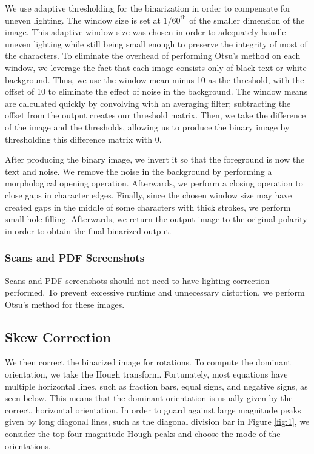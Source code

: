 \documentclass[journal]{IEEEtran}
\begin{document}
We use adaptive thresholding for the binarization in order to compensate for uneven lighting. The window size is set at $1/60^{\text{th}}$ of the smaller dimension of the image. This adaptive window size was chosen in order to adequately handle uneven lighting while still being small enough to preserve the integrity of most of the characters. To eliminate the overhead of performing Otsu's method on each window, we leverage the fact that each image consists only of black text or white background. Thus, we use the window mean minus 10 as the threshold, with the offset of 10 to eliminate the effect of noise in the background. The window means are calculated quickly by convolving with an averaging filter; subtracting the offset from the output creates our threshold matrix. Then, we take the difference of the image and the thresholds, allowing us to produce the binary image by thresholding this difference matrix with $0$.

After producing the binary image, we invert it so that the foreground is now the text and noise. We remove the noise in the background by performing a morphological opening operation. Afterwards, we perform a closing operation to close gaps in character edges. Finally, since the chosen window size may have created gaps in the middle of some characters with thick strokes, we perform small hole filling. Afterwards, we return the output image to the original polarity in order to obtain the final binarized output.

\subsubsection{Scans and PDF Screenshots}
 Scans and PDF screenshots should not need to have lighting correction performed. To prevent excessive runtime and unnecessary distortion, we perform Otsu's method for these images.
 
 \subsection{Skew Correction}
 We then correct the binarized image for rotations. To compute the dominant orientation, we take the Hough transform. Fortunately, most equations have multiple horizontal lines, such as fraction bars, equal signs, and negative signs, as seen below. This means that the dominant orientation is usually given by the correct, horizontal orientation. In order to guard against large magnitude peaks given by long diagonal lines, such as the diagonal division bar in Figure \ref{fig:1}, we consider the top four magnitude Hough peaks and choose the mode of the orientations. 
 
\end{document}
